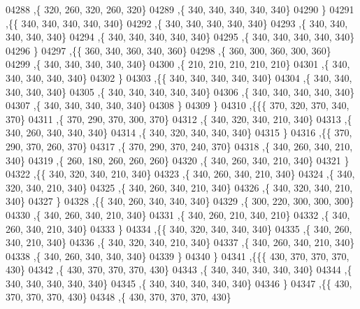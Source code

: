 \begin{DoxyCode}
04288     ,\{   320,   260,   320,   260,   320\}
04289     ,\{   340,   340,   340,   340,   340\}
04290     \}
04291    ,\{\{   340,   340,   340,   340,   340\}
04292     ,\{   340,   340,   340,   340,   340\}
04293     ,\{   340,   340,   340,   340,   340\}
04294     ,\{   340,   340,   340,   340,   340\}
04295     ,\{   340,   340,   340,   340,   340\}
04296     \}
04297    ,\{\{   360,   340,   360,   340,   360\}
04298     ,\{   360,   300,   360,   300,   360\}
04299     ,\{   340,   340,   340,   340,   340\}
04300     ,\{   210,   210,   210,   210,   210\}
04301     ,\{   340,   340,   340,   340,   340\}
04302     \}
04303    ,\{\{   340,   340,   340,   340,   340\}
04304     ,\{   340,   340,   340,   340,   340\}
04305     ,\{   340,   340,   340,   340,   340\}
04306     ,\{   340,   340,   340,   340,   340\}
04307     ,\{   340,   340,   340,   340,   340\}
04308     \}
04309    \}
04310   ,\{\{\{   370,   320,   370,   340,   370\}
04311     ,\{   370,   290,   370,   300,   370\}
04312     ,\{   340,   320,   340,   210,   340\}
04313     ,\{   340,   260,   340,   340,   340\}
04314     ,\{   340,   320,   340,   340,   340\}
04315     \}
04316    ,\{\{   370,   290,   370,   260,   370\}
04317     ,\{   370,   290,   370,   240,   370\}
04318     ,\{   340,   260,   340,   210,   340\}
04319     ,\{   260,   180,   260,   260,   260\}
04320     ,\{   340,   260,   340,   210,   340\}
04321     \}
04322    ,\{\{   340,   320,   340,   210,   340\}
04323     ,\{   340,   260,   340,   210,   340\}
04324     ,\{   340,   320,   340,   210,   340\}
04325     ,\{   340,   260,   340,   210,   340\}
04326     ,\{   340,   320,   340,   210,   340\}
04327     \}
04328    ,\{\{   340,   260,   340,   340,   340\}
04329     ,\{   300,   220,   300,   300,   300\}
04330     ,\{   340,   260,   340,   210,   340\}
04331     ,\{   340,   260,   210,   340,   210\}
04332     ,\{   340,   260,   340,   210,   340\}
04333     \}
04334    ,\{\{   340,   320,   340,   340,   340\}
04335     ,\{   340,   260,   340,   210,   340\}
04336     ,\{   340,   320,   340,   210,   340\}
04337     ,\{   340,   260,   340,   210,   340\}
04338     ,\{   340,   260,   340,   340,   340\}
04339     \}
04340    \}
04341   ,\{\{\{   430,   370,   370,   370,   430\}
04342     ,\{   430,   370,   370,   370,   430\}
04343     ,\{   340,   340,   340,   340,   340\}
04344     ,\{   340,   340,   340,   340,   340\}
04345     ,\{   340,   340,   340,   340,   340\}
04346     \}
04347    ,\{\{   430,   370,   370,   370,   430\}
04348     ,\{   430,   370,   370,   370,   430\}

\end{DoxyCode}
